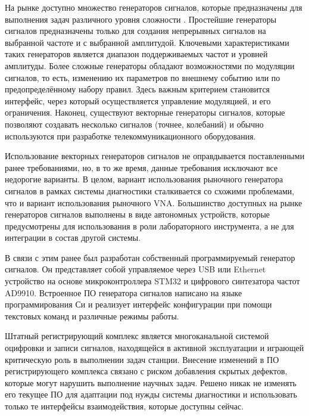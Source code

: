 \documentclass{report}
\begin{document}

На рынке доступно множество генераторов сигналов, которые предназначены для выполнения задач различного уровня сложности \cite{siggen1} \cite{siggen2}. Простейшие генераторы сигналов предназначены только для создания непрерывных сигналов на выбранной частоте и с выбранной амплитудой. Ключевыми характеристиками таких генераторов является диапазон поддерживаемых частот и уровней амплитуды. Более сложные генераторы обладают возможностями по модуляции сигналов, то есть, изменению их параметров по внешнему событию или по предопределённому набору правил. Здесь важным критерием становится интерфейс, через который осуществляется управление модуляцией, и его ограничения. Наконец, существуют векторные генераторы сигналов, которые позволяют создавать несколько сигналов (точнее, колебаний) и обычно используются при разработке телекоммуникационного оборудования.

Использование векторных генераторов сигналов не оправдывается поставленными ранее требованиями, но, в то же время, данные требования исключают все недорогие варианты. В целом, вариант использования рыночного генератора сигналов в рамках системы диагностики сталкивается со схожими проблемами, что и вариант использования рыночного VNA. Большинство доступных на рынке генераторов сигналов выполнены в виде автономных устройств, которые предусмотрены для использования в роли лабораторного инструмента, а не для интеграции в состав другой системы.

В связи с этим ранее был разработан собственный программируемый генератор сигналов. Он представляет собой управляемое через USB или Ethernet устройство на основе микроконтроллера STM32 и цифрового синтезатора частот AD9910. Встроенное ПО генератора сигналов написано на языке программирования Си и реализует интерфейс конфигурации при помощи текстовых команд и различные режимы работы.

Штатный регистрирующий комплекс является многоканальной системой оцифровки и записи сигналов, находящейся в активной эксплуатации и играющей критическую роль в выполнении  задач станции. Внесение изменений в ПО регистрирующего комплекса связано с риском добавления скрытых дефектов, которые могут нарушить выполнение научных задач. Решено никак не изменять его текущее ПО для адаптации под нужды системы диагностики и использовать только те интерфейсы взаимодействия, которые доступны сейчас.
\end{document}
